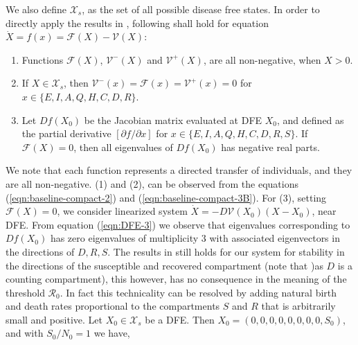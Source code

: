\documentclass[authoryear,preprint]{elsarticle}
\begin{document}
%
%
We also define $\mathcal{X}_s$, as the set of all possible disease free states. In order to directly apply the results in \cite{VANDENDRIESSCHE200229}, following shall hold for equation $\dot{X} = f(x) = \mathcal{F}(X) - \mathcal{V}(X)$:
\begin{enumerate}
	\item Functions $\mathcal{F}(X)$, $\mathcal{V}^{-}(X)$ and $\mathcal{V}^{+}(X)$, are all non-negative, when $X > 0$.
	\item If $X \in \mathcal{X}_s$, then $\mathcal{V}^{-}(x)=\mathcal{F}(x)=\mathcal{V}^{+}(x)=0$ for $x \in \{E, I, A, Q, H, C, D, R\}$.
	\item Let $Df(X_0)$ be the Jacobian matrix evaluated at DFE $X_0$, and defined as the partial derivative $[{\partial f}/{\partial x}]$ for $x \in \{E, I, A, Q, H, C, D, R, S\}$. If $\mathcal{F}(X) = 0$, then all eigenvalues of $Df(X_0)$ has negative real parts.
\end{enumerate}
We note that each function represents a directed transfer of individuals, and they are all non-negative. (1) and (2), can be observed from the equations (\ref{eqn:baseline-compact-2}) and (\ref{eqn:baseline-compact-3B}).  For (3), setting $\mathcal{F}(X) = 0$, we consider linearized system $\dot{X} = - D\mathcal{V}(X_0)(X-X_0)$, near DFE. From equation (\ref{eqn:DFE-3}) we observe that eigenvalues corresponding to $Df(X_0)$ has zero eigenvalues of multiplicity $3$ with associated eigenvectors in the directions of $D, R, S$. The results in \cite{VANDENDRIESSCHE200229} still holds for our system for stability in the directions of the susceptible and recovered compartment (note that )as $D$ is a counting compartment), this however, has no consequence in the meaning of the threshold $\mathcal{R}_0$. In fact this technicality can be resolved by adding natural birth and death rates proportional to the compartments $S$ and $R$ that is arbitrarily small and positive. 
%
%
Let $X_0 \in \mathcal{X}_s$ be a DFE. Then $X_0 = \left( 0, 0, 0, 0, 0, 0, 0, 0, S_0 \right) $, and with $S_0/N_0=1$ we have, 
%
%
\end{document}
